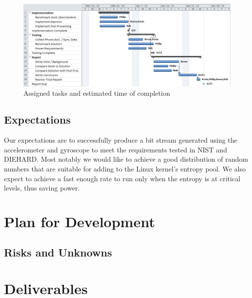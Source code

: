 \documentclass[conference]{IEEEtran}
\begin{document}


\begin{figure}[ht]
    \centering
    \includegraphics[scale=0.71]{proj-ghantt-v3}
    \caption{Assigned tasks and estimated time of completion}
    \label{fig:gahntt}
\end{figure}

\subsection{Expectations}
Our expectations are to successfully produce a bit stream generated using the accelerometer and gyroscope to meet the requirements tested in NIST and DIEHARD.
Most notably we would like to achieve a good distribution of random numbers that are suitable for adding to the Linux kernel's entropy pool. We also expect
to achieve a fast enough rate to run only when the entropy is at critical levels, thus saving power.



\section{Plan for Development}


\subsection{Risks and Unknowns}


\section{Deliverables}

\end{document}
